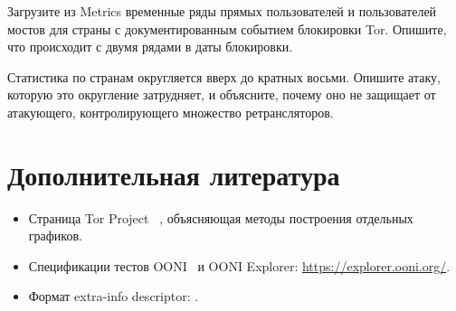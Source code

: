 \begin{esercizio}[2]\label{es:24-censura}
Загрузите из Metrics временные ряды прямых пользователей и пользователей мостов для страны с документированным событием блокировки Tor. Опишите, что происходит с двумя рядами в даты блокировки.
\end{esercizio}

\begin{esercizio}[3]\label{es:24-privacy}
Статистика по странам округляется вверх до кратных восьми. Опишите атаку, которую это округление затрудняет, и объясните, почему оно не защищает от атакующего, контролирующего множество ретрансляторов.
\end{esercizio}

\section*{Дополнительная литература}
\begin{itemize}
  \item Страница Tor Project ~\cite{metricsreproducible}, объясняющая методы построения отдельных графиков.
  \item Спецификации тестов OONI~\cite{oonitor} и OONI Explorer: \url{https://explorer.ooni.org/}.
  \item Формат extra-info descriptor: .
\end{itemize}
